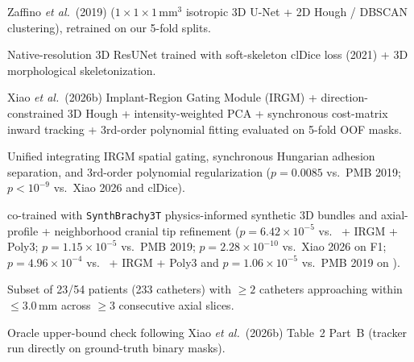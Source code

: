 \begin{table}[tbp]
\begin{threeparttable}
\begin{tablenotes}[flushleft]
\item[a] Zaffino \emph{et al.}\ (2019) ($1\times1\times1$\,mm$^3$ isotropic 3D U-Net + 2D Hough / DBSCAN clustering), retrained on our 5-fold splits.
\item[b] Native-resolution 3D ResUNet trained with soft-skeleton clDice loss (2021) + 3D morphological skeletonization.
\item[c] Xiao \emph{et al.}\ (2026b) Implant-Region Gating Module (IRGM) + direction-constrained 3D Hough + intensity-weighted PCA + synchronous cost-matrix inward tracking + 3rd-order polynomial fitting evaluated on 5-fold OOF masks.
\item[d] Unified \NF{} integrating IRGM spatial gating, synchronous Hungarian adhesion separation, and 3rd-order polynomial regularization ($p = 0.0085$ vs.\ PMB 2019; $p < 10^{-9}$ vs.\ Xiao 2026 and clDice).
\item[e] \NF{} co-trained with \texttt{SynthBrachy3T} physics-informed synthetic 3D bundles and axial-profile + neighborhood cranial tip refinement ($p = 6.42\times10^{-5}$ vs.\ \NF{} + IRGM + Poly3; $p = 1.15\times10^{-5}$ vs.\ PMB 2019; $p = 2.28\times10^{-10}$ vs.\ Xiao 2026 on F1; $p = 4.96\times10^{-4}$ vs.\ \NF{} + IRGM + Poly3 and $p = 1.06\times10^{-5}$ vs.\ PMB 2019 on \Etip{}).
\item[f] Subset of 23/54 patients (233 catheters) with $\ge 2$ catheters approaching within $\le 3.0$\,mm across $\ge 3$ consecutive axial slices.
\item[g] Oracle upper-bound check following Xiao \emph{et al.}\ (2026b) Table~2 Part~B (tracker run directly on ground-truth binary masks).
\end{tablenotes}
\end{threeparttable}
\end{table}
